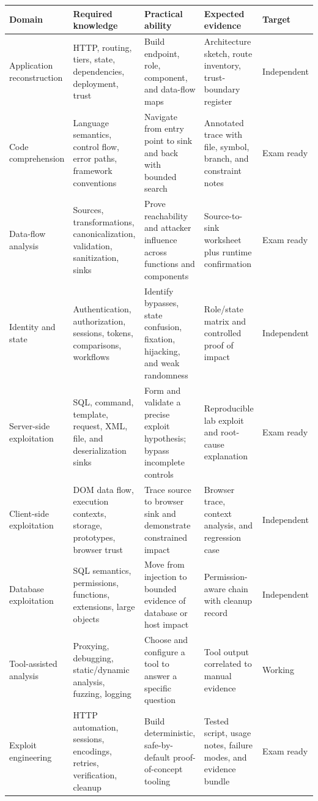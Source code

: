 \documentclass[11pt]{article}
\begin{document}
\small
\begin{longtable}{@{}L{0.17\textwidth}L{0.17\textwidth}L{0.19\textwidth}L{0.18\textwidth}L{\tabcolsep\relax}@{}}
\toprule
\textbf{Domain} & \textbf{Required knowledge} & \textbf{Practical ability} & \textbf{Expected evidence} & \textbf{Target} \\
\midrule
\endhead
Application reconstruction & HTTP, routing, tiers, state, dependencies, deployment, trust & Build endpoint, role, component, and data-flow maps & Architecture sketch, route inventory, trust-boundary register & Independent \\
Code comprehension & Language semantics, control flow, error paths, framework conventions & Navigate from entry point to sink and back with bounded search & Annotated trace with file, symbol, branch, and constraint notes & Exam ready \\
Data-flow analysis & Sources, transformations, canonicalization, validation, sanitization, sinks & Prove reachability and attacker influence across functions and components & Source-to-sink worksheet plus runtime confirmation & Exam ready \\
Identity and state & Authentication, authorization, sessions, tokens, comparisons, workflows & Identify bypasses, state confusion, fixation, hijacking, and weak randomness & Role/state matrix and controlled proof of impact & Independent \\
Server-side exploitation & SQL, command, template, request, XML, file, and deserialization sinks & Form and validate a precise exploit hypothesis; bypass incomplete controls & Reproducible lab exploit and root-cause explanation & Exam ready \\
Client-side exploitation & DOM data flow, execution contexts, storage, prototypes, browser trust & Trace source to browser sink and demonstrate constrained impact & Browser trace, context analysis, and regression case & Independent \\
Database exploitation & SQL semantics, permissions, functions, extensions, large objects & Move from injection to bounded evidence of database or host impact & Permission-aware chain with cleanup record & Independent \\
Tool-assisted analysis & Proxying, debugging, static/dynamic analysis, fuzzing, logging & Choose and configure a tool to answer a specific question & Tool output correlated to manual evidence & Working \\
Exploit engineering & HTTP automation, sessions, encodings, retries, verification, cleanup & Build deterministic, safe-by-default proof-of-concept tooling & Tested script, usage notes, failure modes, and evidence bundle & Exam ready \\

\end{longtable}
\end{document}
